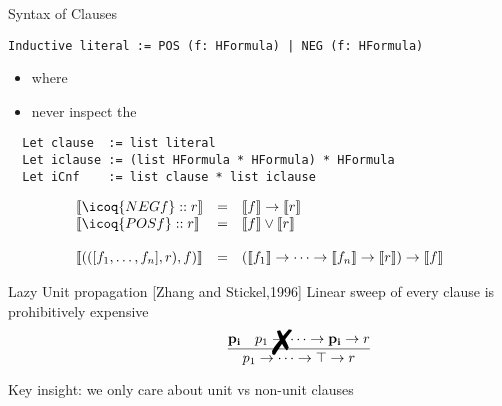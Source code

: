 \documentclass{beamer}
\newcommand{\xmark}{\ding{55}}%
\begin{document}
\begin{frame}[fragile]{Syntax of Clauses}
\begin{verbatim}
Inductive literal := POS (f: HFormula) | NEG (f: HFormula)
\end{verbatim}
\begin{itemize}
\item where  
\item never inspect the 
\end{itemize}
\bigskip

\begin{verbatim}
  Let clause  := list literal
  Let iclause := (list HFormula * HFormula) * HFormula
  Let iCnf    := list clause * list iclause
\end{verbatim}

\[
  \begin{array}{lcl}
    \llbracket \icoq{NEG f} :: r \rrbracket &=& \llbracket f \rrbracket \to \llbracket r \rrbracket \\
    \llbracket \icoq{POS f} :: r \rrbracket &=& \llbracket f \rrbracket \lor \llbracket r \rrbracket \\
    \\
    \llbracket (([f_1,\dots,f_n],r),f) \rrbracket &=& (\llbracket f_1 \rrbracket \to \dots \to \llbracket f_n \rrbracket \to \llbracket r \rrbracket) \to \llbracket f \rrbracket
  \end{array}
\]

\end{frame}


\begin{frame}[fragile]{Lazy Unit propagation [Zhang and Stickel,1996]}
Linear sweep of every clause is prohibitively expensive 
\[
  \dfrac{ \mathbf{p_i} \quad p_1 \to \dots \to \mathbf{p_i} \to r}
  { p_1 \to \dots \to \mathbf{\top} \to r}
  \kern -2.5cm {\textnormal{\Huge\xmark} }
\]

Key insight: we only care about unit vs non-unit clauses\\


\end{frame}
\end{document}
